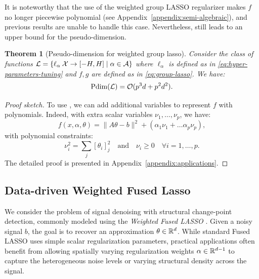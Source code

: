 \documentclass{article}
\theoremstyle{plain}
\newtheorem{theorem}{Theorem}[section]
\theoremstyle{definition}
\theoremstyle{remark}
\begin{document}
It is noteworthy that the use of the weighted group LASSO regularizer makes $f$ no longer piecewise polynomial (see Appendix~\ref{appendix:semi-algebraic}), and previous results are unable to handle this case. Nevertheless,  still leads to an upper bound for the pseudo-dimension. 
\begin{theorem}[Pseudo-dimension for weighted group lasso]
    \label{thm:group-lasso}
	Consider the class of functions $\mathcal{L} =\{\ell_\alpha\:\mathcal{X} \to [-H,H] \mid \alpha \in \mathcal{A}\}$ where $\ell_\alpha$ is defined as in \eqref{eq:hyper-parameters-tuning} and $f,g$ are defined as in \eqref{eq:group-lasso}. We have:
	\begin{equation*}
		\text{\normalfont Pdim}(\mathcal{L}) = \mathcal{O}(p^3d + p^2d^2).
	\end{equation*}
\end{theorem}
\begin{proof}[Proof sketch]
    To use , we can add additional variables to represent $f$ with polynomials. Indeed, with extra scalar variables $\nu_1, \ldots, \nu_p$, we have:
    \begin{equation*}
		f(x, \alpha, \theta) = \|A\theta - b\|^2 + (\alpha_1 \nu_1 + \ldots \alpha_p\nu_p), 
	\end{equation*}
	with polynomial constraints:
	\begin{equation*}
		\nu_i^2 = \sum_{j} [\theta_i]_j^2 \quad \text{and} \quad \nu_i \geq 0 \quad  \forall i = 1, \ldots, p.
	\end{equation*}
    The detailed proof is presented in Appendix~\ref{appendix:applications}.
\end{proof}

\subsection{Data-driven Weighted Fused Lasso}

We consider the problem of signal denoising with structural change-point detection, commonly modeled using the \textit{Weighted Fused LASSO} \citep{tibshirani2005sparsity}. Given a noisy signal $b$, the goal is to recover an approximation $\theta \in \mathbb{R}^d$. While standard Fused LASSO uses simple scalar regularization parameters, practical applications often benefit from allowing spatially varying regularization weights $\alpha \in \mathbb{R}^{d - 1}$ to capture the heterogeneous noise levels or varying structural density across the signal. 
\end{document}

